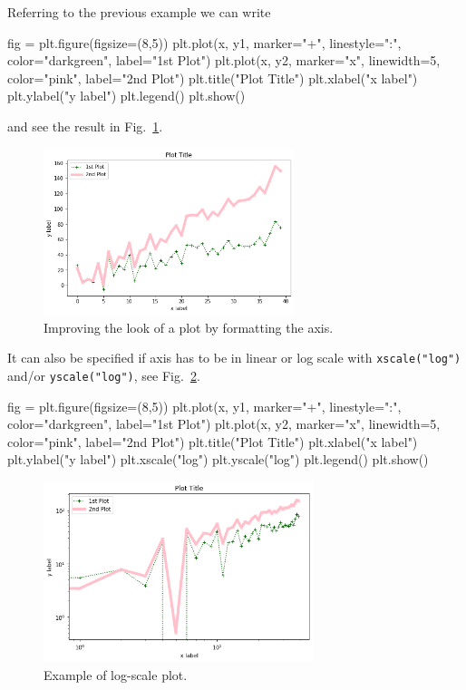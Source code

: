 Referring to the previous example we can write

\begin{ipythonnon}
fig = plt.figure(figsize=(8,5))
plt.plot(x, y1, marker="+", linestyle=":", color="darkgreen", label="1st Plot")
plt.plot(x, y2, marker="x", linewidth=5, color="pink", label="2nd Plot")
plt.title("Plot Title")
plt.xlabel("x label")
plt.ylabel("y label")
plt.legend()
plt.show()
\end{ipythonnon}
\noindent
and see the result in Fig.~\ref{fig:axis1}.

\begin{figure}[htb]
	\centering
	\includegraphics[width=0.65\textwidth]{figures/axis1}
	\caption{Improving the look of a plot by formatting the axis.}
	\label{fig:axis1}
\end{figure}

It can also be specified if axis has to be in linear or log scale with \texttt{xscale("log")} and/or \texttt{yscale("log")}, see Fig.~\ref{fig:axis2}.

\begin{ipythonnon}
fig = plt.figure(figsize=(8,5))
plt.plot(x, y1, marker="+", linestyle=":", color="darkgreen", label="1st Plot")
plt.plot(x, y2, marker="x", linewidth=5, color="pink", label="2nd Plot")
plt.title("Plot Title")
plt.xlabel("x label")
plt.ylabel("y label")
plt.xscale("log")
plt.yscale("log")
plt.legend()
plt.show()
\end{ipythonnon}

\begin{figure}[htb]
	\centering
	\includegraphics[width=0.7\textwidth]{figures/axis2}
	\caption{Example of log-scale plot.}
	\label{fig:axis2}
\end{figure}

